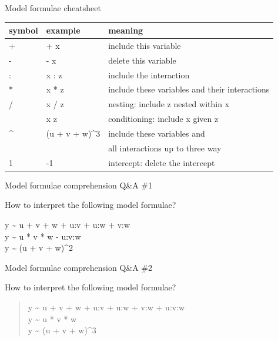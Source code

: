 \documentclass[
  ignorenonframetext,
]{beamer}
\begin{document}
\begin{frame}{Model formulae cheatsheet}
\protect\hypertarget{model-formulae-cheatsheet}{}

\begin{longtable}[]{@{}lll@{}}
\toprule
symbol & example & meaning\tabularnewline
\midrule
\endhead
+ & + x & include this variable\tabularnewline
- & - x & delete this variable\tabularnewline
: & x : z & include the interaction\tabularnewline
* & x * z & include these variables and their
interactions\tabularnewline
/ & x / z & nesting: include z nested within x\tabularnewline
\textbar{} & x \textbar{} z & conditioning: include x given
z\tabularnewline
\^{} & (u + v + w)\^{}3 & include these variables and\tabularnewline
~ & ~ & all interactions up to three way\tabularnewline
1 & -1 & intercept: delete the intercept\tabularnewline
\bottomrule
\end{longtable}

\end{frame}

\begin{frame}{Model formulae comprehension Q\&A \#1}
\protect\hypertarget{model-formulae-comprehension-qa-1}{}

How to interpret the following model formulae?

y \textasciitilde{} u + v + w + u:v + u:w + v:w\\
y \textasciitilde{} u * v * w - u:v:w\\
y \textasciitilde{} (u + v + w)\^{}2

\end{frame}

\begin{frame}{Model formulae comprehension Q\&A \#2}
\protect\hypertarget{model-formulae-comprehension-qa-2}{}

How to interpret the following model formulae?

\begin{quote}
y \textasciitilde{} u + v + w + u:v + u:w + v:w + u:v:w\\
y \textasciitilde{} u * v * w\\
y \textasciitilde{} (u + v + w)\^{}3
\end{quote}

\end{frame}
\end{document}
